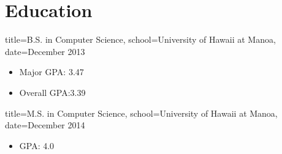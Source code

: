 \documentclass{resume}
\begin{document}

\makeheader

\section*{Education}
\begin{degree}{title=B.S. in Computer Science,
               school=University of Hawaii at Manoa,
               date=December 2013}
    \begin{itemize}
        \item{Major GPA: 3.47}
        \item{Overall GPA:3.39}
    \end{itemize}
\end{degree}

\begin{degree}{title=M.S. in Computer Science,
               school=University of Hawaii at Manoa,
               date=December 2014}
    \begin{itemize}
        \item{GPA: 4.0}
    \end{itemize}
\end{degree}
\end{document}
